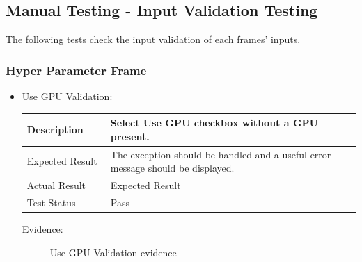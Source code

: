 \documentclass[./project-report/src/latex/project-report.tex]{subfiles}
\begin{document}
\subsection{Manual Testing - Input Validation Testing}

The following tests check the input validation of each frames' inputs.

\subsubsection{Hyper Parameter Frame}
\label{sec:hyper-parameter-frame-input-validation}
\begin{itemize}
	\item Use GPU Validation: \newline\newline
		\begin{tabular}{|p{0.25\linewidth}|p{0.75\linewidth}|}
			\hline
			Description & Select Use GPU checkbox without a GPU present. \\
			\hline
			Expected Result & The exception should be handled and a useful error message should be displayed. \\
			\hline
			Actual Result & Expected Result \\
			\hline
			Test Status & Pass \\
			\hline
		\end{tabular}

		\vspace{5mm}

		Evidence:
		\begin{figure}[h!]
		\centering
		\caption{Use GPU Validation evidence}
		\end{figure}


\end{itemize}
\end{document}

